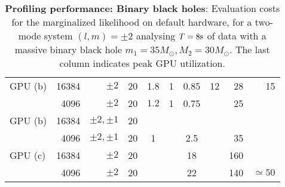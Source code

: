 \documentclass[twocolumn,prd,nofootinbib]{revtex4}
\newcommand\unit[1]{{\rm #1}}
\begin{document}
\begin{table*}
\begin{tabular}{lrr|ccccc|rr}
GPU (b) & 16384 & $\pm 2$ & 20  & 1.8 & 1 & 0.85& 12 &28 & 15\\
       & 4096 & $\pm 2$  & 20 & $1.2 $ &  1  & 0.75 &  & 25\\ \hline
GPU (b) & 16384 & $\pm 2, \pm 1$ & 20  \\
       & 4096 & $\pm 2, \pm 1$ & 20 & 1&& 2.5  && 35 & \\ \hline
%
GPU (c) & 16384 & $\pm 2 $  & 20  & & & 18& &160 &  \\
            & 4096 &$\pm 2 $  &  20 &  & & 22  & & 140 & $\simeq 50$ \\
\end{tabular}
\caption{\label{tab:CostBreakdown}\textbf{Profiling performance: Binary black holes}: Evaluation costs for the
  marginalized likelihood on default
  hardware, for a two-mode system $(l,m)=\pm 2$ analysing $T=8\unit{s}$ of data with a massive binary black hole
  $m_1=35 M_\odot,M_2=30 M_\odot$.  The last column indicates peak GPU utilization.}
\end{table*}
\end{document}
